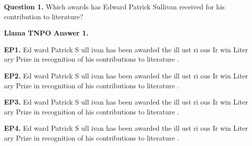 \begin{mdframed}\small
\textbf{Question 1.}
 Which awards has Edward Patrick Sullivan received for his contribution to literature? 
\end{mdframed}

\begin{mdframed}\small
\textbf{Llama TNPO Answer 1.}

\textbf{EP1.} \textcolor{Gray8}{Ed} \textcolor{Gray9}{ward} \textcolor{Gray9}{Patrick} \textcolor{Gray9}{S} \textcolor{Gray9}{ull} \textcolor{Gray9}{ivan} \textcolor{Gray8}{has} \textcolor{Gray6}{been} \textcolor{Gray4}{awarded} \textcolor{Gray8}{the} \textcolor{Gray5}{ill} \textcolor{Gray9}{ust} \textcolor{Gray6}{ri} \textcolor{Gray9}{ous} \textcolor{Gray7}{Ir} \textcolor{Gray5}{win} \textcolor{Gray9}{Liter} \textcolor{Gray9}{ary} \textcolor{Gray8}{Prize} \textcolor{Gray8}{in} \textcolor{Gray8}{recognition} \textcolor{Gray9}{of} \textcolor{Gray9}{his} \textcolor{Gray7}{contributions} \textcolor{Gray9}{to} \textcolor{Gray9}{literature} \textcolor{Gray9}{.} 

\textbf{EP2.} \textcolor{Gray7}{Ed} \textcolor{Gray9}{ward} \textcolor{Gray9}{Patrick} \textcolor{Gray9}{S} \textcolor{Gray9}{ull} \textcolor{Gray9}{ivan} \textcolor{Gray5}{has} \textcolor{Gray1}{been} \textcolor{Gray2}{awarded} \textcolor{Gray5}{the} \textcolor{Gray2}{ill} \textcolor{Gray9}{ust} \textcolor{Gray6}{ri} \textcolor{Gray7}{ous} \textcolor{Gray4}{Ir} \textcolor{Gray5}{win} \textcolor{Gray8}{Liter} \textcolor{Gray9}{ary} \textcolor{Gray7}{Prize} \textcolor{Gray3}{in} \textcolor{Gray5}{recognition} \textcolor{Gray9}{of} \textcolor{Gray9}{his} \textcolor{Gray3}{contributions} \textcolor{Gray9}{to} \textcolor{Gray8}{literature} \textcolor{Gray8}{.}  

\textbf{EP3.} \textcolor{Gray0}{Ed} \textcolor{Gray0}{ward} \textcolor{Gray0}{Patrick} \textcolor{Gray0}{S} \textcolor{Gray0}{ull} \textcolor{Gray0}{ivan} \textcolor{Gray0}{has} \textcolor{Gray0}{been} \textcolor{Gray0}{awarded} \textcolor{Gray0}{the} \textcolor{Gray0}{ill} \textcolor{Gray0}{ust} \textcolor{Gray0}{ri} \textcolor{Gray0}{ous} \textcolor{Gray0}{Ir} \textcolor{Gray0}{win} \textcolor{Gray0}{Liter} \textcolor{Gray0}{ary} \textcolor{Gray0}{Prize} \textcolor{Gray0}{in} \textcolor{Gray0}{recognition} \textcolor{Gray0}{of} \textcolor{Gray0}{his} \textcolor{Gray0}{contributions} \textcolor{Gray0}{to} \textcolor{Gray0}{literature} \textcolor{Gray0}{.} 

\textbf{EP4.} \textcolor{Gray0}{Ed} \textcolor{Gray0}{ward} \textcolor{Gray0}{Patrick} \textcolor{Gray0}{S} \textcolor{Gray0}{ull} \textcolor{Gray0}{ivan} \textcolor{Gray0}{has} \textcolor{Gray0}{been} \textcolor{Gray0}{awarded} \textcolor{Gray0}{the} \textcolor{Gray0}{ill} \textcolor{Gray0}{ust} \textcolor{Gray0}{ri} \textcolor{Gray0}{ous} \textcolor{Gray0}{Ir} \textcolor{Gray0}{win} \textcolor{Gray0}{Liter} \textcolor{Gray0}{ary} \textcolor{Gray0}{Prize} \textcolor{Gray0}{in} \textcolor{Gray0}{recognition} \textcolor{Gray0}{of} \textcolor{Gray0}{his} \textcolor{Gray0}{contributions} \textcolor{Gray0}{to} \textcolor{Gray0}{literature} \textcolor{Gray0}{.} 



\end{mdframed}
